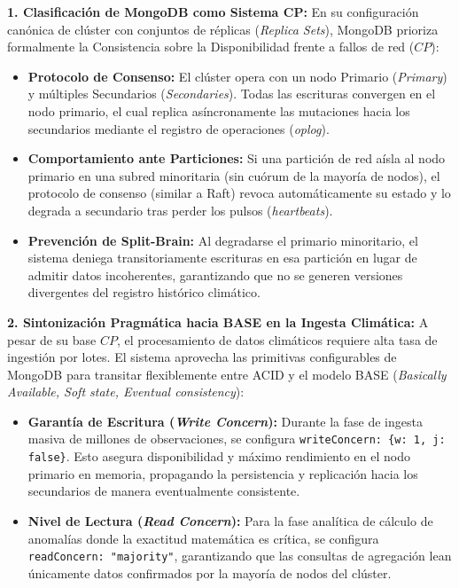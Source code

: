 \documentclass[conference]{IEEEtran}
\begin{document}
\textbf{1. Clasificación de MongoDB como Sistema CP:}
En su configuración canónica de clúster con conjuntos de réplicas (\textit{Replica Sets}), MongoDB prioriza formalmente la Consistencia sobre la Disponibilidad frente a fallos de red ($CP$):
\begin{itemize}
    \item \textbf{Protocolo de Consenso:} El clúster opera con un nodo Primario (\textit{Primary}) y múltiples Secundarios (\textit{Secondaries}). Todas las escrituras convergen en el nodo primario, el cual replica asíncronamente las mutaciones hacia los secundarios mediante el registro de operaciones (\textit{oplog}).
    \item \textbf{Comportamiento ante Particiones:} Si una partición de red aísla al nodo primario en una subred minoritaria (sin cuórum de la mayoría de nodos), el protocolo de consenso (similar a Raft) revoca automáticamente su estado y lo degrada a secundario tras perder los pulsos (\textit{heartbeats}).
    \item \textbf{Prevención de Split-Brain:} Al degradarse el primario minoritario, el sistema deniega transitoriamente escrituras en esa partición en lugar de admitir datos incoherentes, garantizando que no se generen versiones divergentes del registro histórico climático.
\end{itemize}

\textbf{2. Sintonización Pragmática hacia BASE en la Ingesta Climática:}
A pesar de su base $CP$, el procesamiento de datos climáticos requiere alta tasa de ingestión por lotes. El sistema aprovecha las primitivas configurables de MongoDB para transitar flexiblemente entre ACID y el modelo BASE (\textit{Basically Available, Soft state, Eventual consistency}):
\begin{itemize}
    \item \textbf{Garantía de Escritura (\textit{Write Concern}):} Durante la fase de ingesta masiva de millones de observaciones, se configura \texttt{writeConcern: \{w: 1, j: false\}}. Esto asegura disponibilidad y máximo rendimiento en el nodo primario en memoria, propagando la persistencia y replicación hacia los secundarios de manera eventualmente consistente.
    \item \textbf{Nivel de Lectura (\textit{Read Concern}):} Para la fase analítica de cálculo de anomalías donde la exactitud matemática es crítica, se configura \texttt{readConcern: "majority"}, garantizando que las consultas de agregación lean únicamente datos confirmados por la mayoría de nodos del clúster.
\end{itemize}
\end{document}
